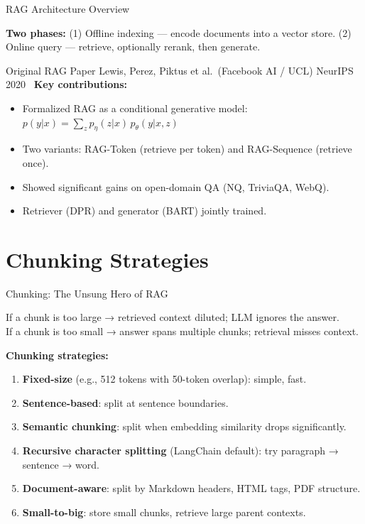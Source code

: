 \documentclass[aspectratio=169,10pt]{beamer}
\begin{document}
\begin{frame}{RAG Architecture Overview}
  
  \vspace{0.3em}
  \textbf{Two phases:} (1) Offline indexing — encode documents into a vector store.
  (2) Online query — retrieve, optionally rerank, then generate.
\end{frame}

\begin{frame}{Original RAG Paper}
    {Lewis, Perez, Piktus et al.\ (Facebook AI / UCL)}
    {NeurIPS 2020~\cite{lewis2020retrieval}}
  \vspace{0.4em}
  \textbf{Key contributions:}
  \begin{itemize}
    \item Formalized RAG as a conditional generative model:
          $p(y|x) = \sum_z p_\eta(z|x)\, p_\theta(y|x, z)$
    \item Two variants: RAG-Token (retrieve per token) and RAG-Sequence (retrieve once).
    \item Showed significant gains on open-domain QA (NQ, TriviaQA, WebQ).
    \item Retriever (DPR) and generator (BART) jointly trained.
  \end{itemize}
\end{frame}

\section{Chunking Strategies}

\begin{frame}{Chunking: The Unsung Hero of RAG}
  \begin{tcolorbox}[alertbox, title=Why Chunking Matters]
    If a chunk is too large → retrieved context diluted; LLM ignores the answer.\\
    If a chunk is too small → answer spans multiple chunks; retrieval misses context.
  \end{tcolorbox}
  \vspace{0.4em}
  \textbf{Chunking strategies:}
  \begin{enumerate}
    \item \textbf{Fixed-size} (e.g., 512 tokens with 50-token overlap): simple, fast.
    \item \textbf{Sentence-based}: split at sentence boundaries.
    \item \textbf{Semantic chunking}: split when embedding similarity drops significantly.
    \item \textbf{Recursive character splitting} (LangChain default): try paragraph → sentence → word.
    \item \textbf{Document-aware}: split by Markdown headers, HTML tags, PDF structure.
    \item \textbf{Small-to-big}: store small chunks, retrieve large parent contexts.
  \end{enumerate}
\end{frame}
\end{document}

